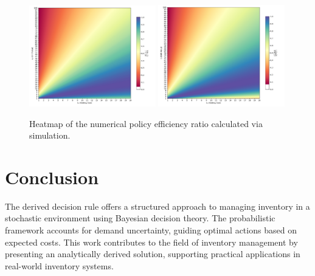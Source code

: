 \documentclass[a4paper,12pt]{article}
\begin{document}
	
	\begin{figure}[h!]
		\centering
		\includegraphics[width=0.49\textwidth]{figures/simulated_per.pdf}
		\includegraphics[width=0.49\textwidth]{figures/simulated_per2.pdf}
		\caption{Heatmap of the numerical policy efficiency ratio calculated via simulation.}
		\label{fig:heatmap_numerical}
	\end{figure}
	


	
	\section{Conclusion}
	The derived decision rule offers a structured approach to managing inventory in a stochastic environment using Bayesian decision theory. The probabilistic framework accounts for demand uncertainty, guiding optimal actions based on expected costs. This work contributes to the field of inventory management by presenting an analytically derived solution, supporting practical applications in real-world inventory systems.
	
	
	
	\newpage
	\begin{appendices}
		
		
		
		
		
	\end{appendices}
	
	
	
	
	
	
\end{document}

